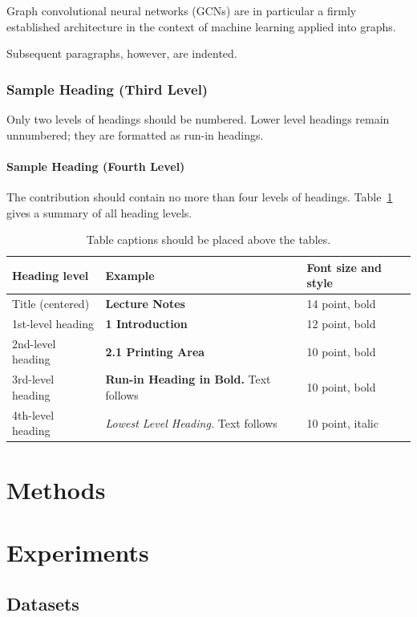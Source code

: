 \documentclass[runningheads]{llncs}
\begin{document}
Graph convolutional neural networks (GCNs) are in particular a firmly 
established architecture in the context of machine learning applied into graphs.


Subsequent paragraphs, however, are indented.

\subsubsection{Sample Heading (Third Level)} Only two levels of
headings should be numbered. Lower level headings remain unnumbered;
they are formatted as run-in headings.

\paragraph{Sample Heading (Fourth Level)}
The contribution should contain no more than four levels of
headings. Table~\ref{tab1} gives a summary of all heading levels.

\begin{table}
\caption{Table captions should be placed above the
tables.}\label{tab1}
\begin{tabular}{|l|l|l|}
\hline
Heading level &  Example & Font size and style\\
\hline
Title (centered) &  {\Large\bfseries Lecture Notes} & 14 point, bold\\
1st-level heading &  {\large\bfseries 1 Introduction} & 12 point, bold\\
2nd-level heading & {\bfseries 2.1 Printing Area} & 10 point, bold\\
3rd-level heading & {\bfseries Run-in Heading in Bold.} Text follows & 10 point, bold\\
4th-level heading & {\itshape Lowest Level Heading.} Text follows & 10 point, italic\\
\hline
\end{tabular}
\end{table}


\section{Methods}

\section{Experiments}

\subsection{Datasets}
\end{document}
